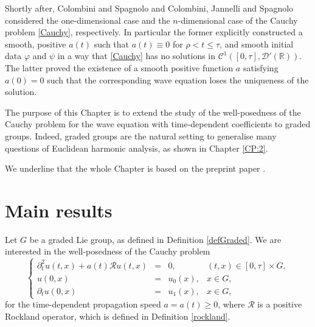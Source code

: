\documentclass[12pt,oneside,a4paper]{book}
\numberwithin{equation}{section}     %
\theoremstyle{plain}
\theoremstyle{definition}
\newcommand{\R}{{\mathbb R}}
\begin{document}
Shortly after, Colombini and Spagnolo \cite{CS1982} and Colombini, Jannelli and Spagnolo \cite{Colombini-Jannelli-Spagnolo:Annals-low-reg} considered the one-dimensional case  and the $n$-dimensional case of the Cauchy problem \eqref{Cauchy}, respectively. In particular the former explicitly constructed a smooth, positive $a(t)$ such that $a(t)\equiv 0$ for $\rho< t\leq \tau$, and smooth initial data $\varphi$ and $\psi$ in a way that \eqref{Cauchy} has no solutions in $\mathcal{C}^1([0,\tau],\mathcal{D}'(\R))$. The latter proved the existence of a smooth positive function $a$ satisfying $a(0)=0$ such that the corresponding wave equation loses the uniqueness of the solution.

The purpose of this Chapter is to extend the study of the well-posedness of the Cauchy problem for the wave equation with time-dependent coefficients to graded groups. Indeed, graded groups are the natural setting to generalise many questions of Euclidean harmonic analysis, as shown in Chapter \ref{CP:2}.

We underline that the whole Chapter is based on the preprint paper \cite{RT2017}.


\section{Main results}\label{SEC:weR}

Let $G$ be a graded Lie group, as defined in Definition \ref{defGraded}. We are interested in the well-posedness of the Cauchy problem
\begin{equation}\label{CP}
\left\{\begin{array}{rclc}
\partial_t^2 u(t,x)+a(t)\mathcal R u(t,x)	&=&0,		&(t,x)\in[0,\tau]\times G,\\
u(0,x)	&=&u_0(x),	&x\in G,\\
\partial_t u(0,x)	&=&u_1(x),	&x\in G,
\end{array}\right.
\end{equation}
for the time-dependent propagation speed $a=a(t)\geq 0$, where $\mathcal{R}$ is a positive Rockland operator, which is defined in Definition \ref{rockland}.
\end{document}
